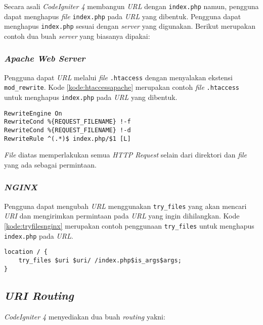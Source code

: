 Secara asali \textit{CodeIgniter 4} membangun \textit{URL} dengan \verb|index.php| namun, pengguna dapat menghapus \textit{file} \verb|index.php| pada \textit{URL} yang dibentuk. Pengguna dapat menghapus \verb|index.php| sesuai dengan \textit{server} yang digunakan. Berikut merupakan contoh dua buah \textit{server} yang biasanya dipakai:

\subsubsection{\textit{Apache Web Server}}
Pengguna dapat \textit{URL} melalui \textit{file} \verb|.htaccess| dengan menyalakan ekstensi \verb|mod_rewrite|. Kode \ref{kode:htaccessapache} merupakan contoh \textit{file} \verb|.htaccess| untuk menghapus \verb|index.php| pada \textit{URL} yang dibentuk.

\begin{lstlisting}[caption=Contoh \textit{file} \texttt{.htaccess} pada \textit{Apache Web Server}. ,label=kode:htaccessapache]
RewriteEngine On
RewriteCond %{REQUEST_FILENAME} !-f
RewriteCond %{REQUEST_FILENAME} !-d
RewriteRule ^(.*)$ index.php/$1 [L]
\end{lstlisting}

\textit{File} diatas memperlakukan semua \textit{HTTP Request} selain dari direktori dan \textit{file} yang ada sebagai permintaan.

\subsubsection{\textit{NGINX}}
Pengguna dapat mengubah \textit{URL} menggunakan \verb|try_files| yang akan mencari \textit{URI} dan mengirimkan permintaan pada \textit{URL} yang ingin dihilangkan. Kode \ref{kode:tryfilesnginx} merupakan contoh penggunaan \verb|try_files| untuk menghapus \verb|index.php| pada \textit{URL}.

\begin{lstlisting}[caption=Contoh penggunaan \texttt{try-files}. ,label=kode:tryfilesnginx]
location / {
    try_files $uri $uri/ /index.php$is_args$args;
}
\end{lstlisting}

\subsection{\textit{URI Routing}}
\textit{CodeIgniter 4} menyediakan dua buah \textit{routing} yakni:
